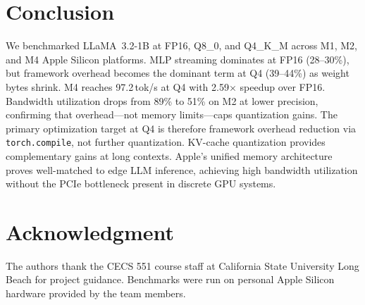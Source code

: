 \documentclass[conference]{IEEEtran}
\begin{document}
\section{Conclusion}

We benchmarked LLaMA~3.2-1B at FP16, Q8\_0, and Q4\_K\_M across M1, M2, and M4 Apple Silicon platforms. MLP streaming dominates at FP16 (28--30\%), but framework overhead becomes the dominant term at Q4 (39--44\%) as weight bytes shrink. M4 reaches 97.2\,tok/s at Q4 with 2.59$\times$ speedup over FP16. Bandwidth utilization drops from 89\% to 51\% on M2 at lower precision, confirming that overhead---not memory limits---caps quantization gains. The primary optimization target at Q4 is therefore framework overhead reduction via \texttt{torch.compile}, not further quantization. KV-cache quantization provides complementary gains at long contexts. Apple's unified memory architecture proves well-matched to edge LLM inference, achieving high bandwidth utilization without the PCIe bottleneck present in discrete GPU systems.

\section*{Acknowledgment}
The authors thank the CECS 551 course staff at California State University Long Beach for project guidance. Benchmarks were run on personal Apple Silicon hardware provided by the team members.

\balance


\end{document}
